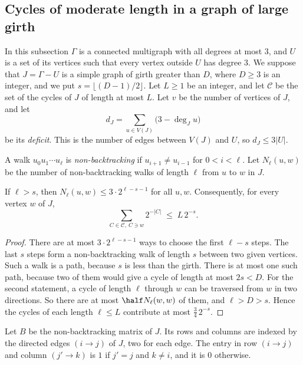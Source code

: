 \subsection{Cycles of moderate length in a graph of large girth}\label{sec:moderate}

In this subsection $\Gamma$ is a connected multigraph with all degrees at most $3$, and $U$ is a
set of its vertices such that every vertex outside $U$ has degree $3$. We suppose that
$J=\Gamma-U$ is a simple graph of girth greater than $D$, where $D\ge3$ is an integer, and we put
$s=\lfloor(D-1)/2\rfloor$. Let $L\ge1$ be an integer, and let $\mathcal{C}$ be the set of the
cycles of $J$ of length at most $L$. Let $v$ be the number of vertices of $J$, and let
\[
  d_J=\sum_{u\in V(J)}\bigl(3-\deg_Ju\bigr)
\]
be its \emph{deficit}. This is the number of edges between $V(J)$ and $U$, so $d_J\le3|U|$.

A walk $u_0u_1\cdots u_\ell$ is \emph{non-backtracking} if $u_{i+1}\ne u_{i-1}$ for $0<i<\ell$. Let
$N_\ell(u,w)$ be the number of non-backtracking walks of length $\ell$ from $u$ to $w$ in $J$.

\begin{lemma}\label{lem:walks}
If $\ell>s$, then $N_\ell(u,w)\le3\cdot2^{\ell-s-1}$ for all $u,w$. Consequently, for every vertex
$w$ of $J$,
\begin{equation}\label{eq:load}
  \sum_{C\in\mathcal{C},\ C\ni w}2^{-|C|}\;\le\;L\,2^{-s}.
\end{equation}
\end{lemma}

\begin{proof}
There are at most $3\cdot2^{\ell-s-1}$ ways to choose the first $\ell-s$ steps. The last $s$ steps
form a non-backtracking walk of length $s$ between two given vertices. Such a walk is a path,
because $s$ is less than the girth. There is at most one such path, because two of them would give
a cycle of length at most $2s<D$. For the second statement, a cycle of length $\ell$ through $w$
can be traversed from $w$ in two directions. So there are at most $\half N_\ell(w,w)$ of them, and
$\ell>D>s$. Hence the cycles of each length $\ell\le L$ contribute at most $\frac34\,2^{-s}$.
\end{proof}

Let $B$ be the non-backtracking matrix of $J$. Its rows and columns are indexed by the directed
edges $(i\to j)$ of $J$, two for each edge. The entry in row $(i\to j)$ and column $(j'\to k)$ is
$1$ if $j'=j$ and $k\ne i$, and it is $0$ otherwise.

